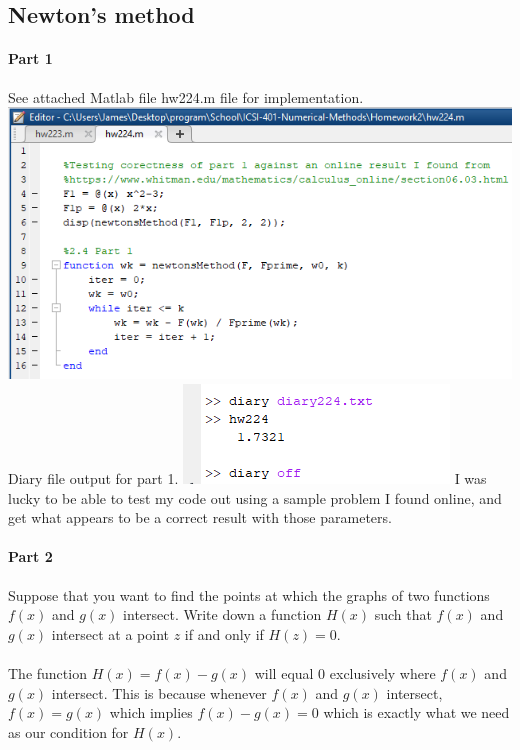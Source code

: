 \documentclass{article}
\begin{document}
\subsection{Newton’s method}

\paragraph{Part 1}
See attached Matlab file hw224.m file for implementation.
\newline
\includegraphics[scale=0.7]{Homework2/2.4code.png}
\newpage
Diary file output for part 1.
\newline
\includegraphics{Homework2/2.4diary.png}
\newline
I was lucky to be able to test my code out using a sample problem I found online, and get what appears to be a correct result with those parameters.  

\paragraph{Part 2}
Suppose that you want to find the points at which the graphs of two functions $f(x)$ and $g(x)$
intersect. Write down a function $H(x)$ such that $f(x)$ and $g(x)$ intersect at a point $z$ if and
only if $H(z) = 0$.
\paragraph{}
The function $H(x) = f(x) - g(x)$ will equal 0 exclusively where $f(x)$ and $g(x)$ intersect. This is because whenever $f(x)$ and $g(x)$ intersect, $f(x) = g(x)$ which implies $f(x) - g(x) = 0$ which is exactly what we need as our condition for $H(x)$.
\end{document}
